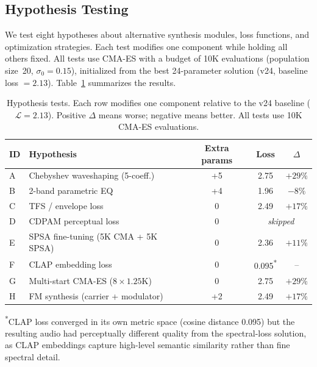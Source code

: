 \subsection{Hypothesis Testing}
\label{sec:hypotheses}

We test eight hypotheses about alternative synthesis modules, loss functions, and optimization strategies.
Each test modifies one component while holding all others fixed.
All tests use CMA-ES with a budget of 10K evaluations (population size~20, $\sigma_0 = 0.15$), initialized from the best 24-parameter solution (v24, baseline loss $= 2.13$).
Table~\ref{tab:hypotheses} summarizes the results.

\begin{table}[ht]
\centering
\caption{Hypothesis tests. Each row modifies one component relative to the v24 baseline ($\mathcal{L} = 2.13$). Positive $\Delta$ means worse; negative means better. All tests use 10K CMA-ES evaluations.}
\label{tab:hypotheses}
\begin{tabular}{@{}llccc@{}}
\toprule
\textbf{ID} & \textbf{Hypothesis} & \textbf{Extra params} & \textbf{Loss} & \textbf{$\Delta$} \\
\midrule
A & Chebyshev waveshaping (5-coeff.) & +5 & 2.75 & $+29\%$ \\
B & 2-band parametric EQ & +4 & 1.96 & $-8\%$ \\
C & TFS / envelope loss & 0 & 2.49 & $+17\%$ \\
D & CDPAM perceptual loss & 0 & \multicolumn{2}{c}{\emph{skipped}\footnotemark} \\
E & SPSA fine-tuning (5K CMA + 5K SPSA) & 0 & 2.36 & $+11\%$ \\
F & CLAP embedding loss & 0 & 0.095\textsuperscript{*} &  --  \\
G & Multi-start CMA-ES ($8 \times 1.25$K) & 0 & 2.75 & $+29\%$ \\
H & FM synthesis (carrier + modulator) & +2 & 2.49 & $+17\%$ \\
\bottomrule
\end{tabular}
\end{table}

\noindent\textsuperscript{*}CLAP loss converged in its own metric space (cosine distance 0.095) but the resulting audio had perceptually different quality from the spectral-loss solution, as CLAP embeddings capture high-level semantic similarity rather than fine spectral detail.

